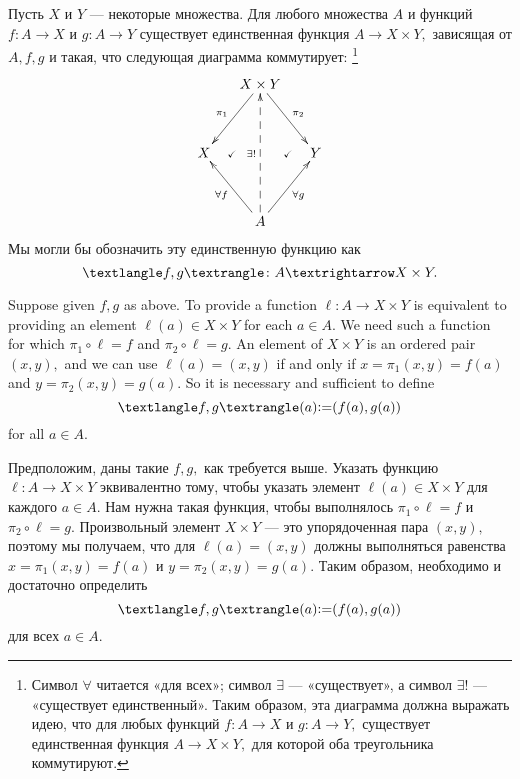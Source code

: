 \documentclass[../main/CT4S-EN-RU]{subfiles}
\begin{document}
\begin{lemmaRUS}\label{lemma:up for prod}
Пусть $X$ и $Y$ — некоторые множества. Для любого множества $A$ и функций $f\colon A{→} X$ и $g\colon A{→} Y$ существует единственная функция $A{→} X\times Y,$ зависящая от $A, f, g$ и такая, что следующая диаграмма коммутирует:%
\footnote{Символ $\forall$ читается «для всех»; символ $\exists$ — «существует», а символ $\exists!$ — «существует единственный». Таким образом, эта диаграмма должна выражать идею, что для любых функций $f\colon A{→} X$ и $g\colon A{→} Y,$ существует единственная функция $A{→} X\times Y,$ для которой оба треугольника коммутируют.}
\begin{align}\label{dia:univ prop for products}
\xymatrix@=15pt{&X\times Y\ar[ldd]_{\pi_1}\ar[rdd]^{\pi_2}\\\\X\ar@{}[r]|{\checkmark}&&Y\ar@{}[l]|{\checkmark}\\\\&A\ar[luu]^{\forall f}\ar[ruu]_{\forall g}\ar@{-->}[uuuu]^{\exists !}}
\end{align}
Мы могли бы обозначить эту единственную функцию как $$\prodmap{f}{g}\colon A{→} X\times Y.$$
\end{lemmaRUS}

\begin{proofENG}
Suppose given $f,g$ as above. To provide a function $\ell\colon A{→} X\times Y$ is equivalent to providing an element $\ell(a)\in X\times Y$ for each $a\in A.$ We need such a function for which $\pi_1\circ \ell=f$ and $\pi_2\circ \ell=g.$ An element of $X\times Y$ is an ordered pair $(x,y),$ and we can use $\ell(a)=(x,y)$ if and only if $x=\pi_1(x,y)=f(a)$ and $y=\pi_2(x,y)=g(a).$ So it is necessary and sufficient to define $$\prodmap{f}{g}(a){\coloneqq}(f(a),g(a))$$ for all $a\in A.$
\end{proofENG}

\begin{proofRUS}
Предположим, даны такие $f,g,$ как требуется выше. Указать функцию $\ell\colon A{→} X\times Y$ эквивалентно тому, чтобы указать элемент $\ell(a)\in X\times Y$ для каждого $a\in A.$ Нам нужна такая функция, чтобы выполнялось $\pi_1\circ \ell=f$ и $\pi_2\circ \ell=g.$ Произвольный элемент $X\times Y$ — это упорядоченная пара $(x,y),$ поэтому мы получаем, что для $\ell(a)=(x,y)$ должны выполняться равенства $x=\pi_1(x,y)=f(a)$ и $y=\pi_2(x,y)=g(a).$ Таким образом, необходимо и достаточно определить $$\prodmap{f}{g}(a){\coloneqq}(f(a),g(a))$$ для всех $a\in A.$
\end{proofRUS}
\end{document}

